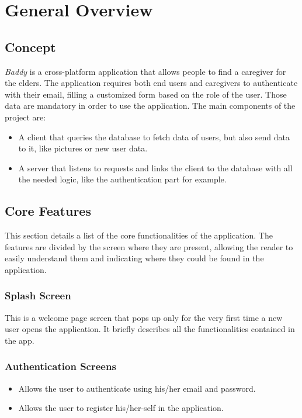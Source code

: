 \documentclass[../../dd.tex]{subfiles}
\begin{document}
\chapter{General Overview}
\section{Concept}
    \textit{Baddy} is a cross-platform application that allows people to find a caregiver for the elders.
    The application requires both end users and caregivers to authenticate with their email, filling a customized form
    based on the role of the user.
    Those data are mandatory in order to use the application.
    The main components of the project are:
    \begin{itemize}
        \item A client that queries the database to fetch data of users, but also send data to it,
        like pictures or new user data.
        \item A server that listens to requests and links the client to the database with all the needed logic, like
        the authentication part for example.
    \end{itemize}
\section{Core Features}
    This section details a list of the core functionalities of the application. The features are divided by the screen where they are present, allowing the reader to easily understand them and indicating where they could be found in the application.
    \subsection{Splash Screen}
    This is a welcome page screen that pops up only for the very first time a new user opens the application.
    It briefly describes all the functionalities contained in the app.

    \subsection{Authentication Screens}
    \begin{itemize}
        \item Allows the user to authenticate using his/her email and password.
        \item Allows the user to register his/her-self in the application.
    \end{itemize}
\end{document}

